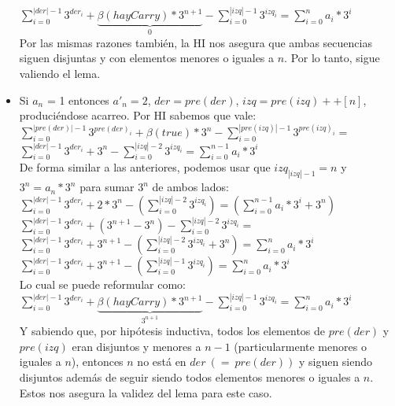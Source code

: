 \begin{itemize}
	$\sum_{i=0}^{|der|-1} 3^{der_i} + \underbrace{\beta(hayCarry)*3^{n+1}}_\text{0} - \sum_{i=0}^{|izq|-1} 3^{izq_i} = \sum_{i=0}^{n} a_i*3^{i} $
	\\

	Por las mismas razones también, la HI nos asegura que ambas secuencias siguen disjuntas y con elementos menores o iguales a $n$. Por lo tanto, sigue valiendo el lema.

	\item Si $a_n$ = 1 entonces $a'_n = 2$, $der = pre(der)$, $izq = pre(izq)++[n]$, produciéndose acarreo. Por HI sabemos que vale: \\

	$\sum_{i=0}^{|pre(der)|-1} 3^{pre(der)_i} + \beta(true)*3^{n} - \sum_{i=0}^{|pre(izq)|-1} 3^{pre(izq)_i} =$
	\\

	$\sum_{i=0}^{|der|-1} 3^{der_i} + 3^{n} - \sum_{i=0}^{|izq|-2} 3^{izq_i} = \sum_{i=0}^{n-1} a_i*3^{i} $
	\\

	De forma similar a las anteriores, podemos usar que $izq_{|izq|-1} = n$ y $ 3^{n} = a_{n}*3^{n}$ para sumar $3^{n}$ de ambos lados:
	\\

	$\sum_{i=0}^{|der|-1} 3^{der_i} + 2*3^{n} - (\sum_{i=0}^{|izq|-2} 3^{izq_i}) = (\sum_{i=0}^{n-1} a_i*3^{i} + 3^{n}) $
	\\

	$\sum_{i=0}^{|der|-1} 3^{der_i} + (3^{n+1}-3^{n}) - \sum_{i=0}^{|izq|-2} 3^{izq_i} = $
	\\

	$\sum_{i=0}^{|der|-1} 3^{der_i} + 3^{n+1} - (\sum_{i=0}^{|izq|-2} 3^{izq_i} + 3^{n}) = \sum_{i=0}^{n} a_i*3^{i} $	\\

	$\sum_{i=0}^{|der|-1} 3^{der_i} + 3^{n+1} - (\sum_{i=0}^{|izq|-1} 3^{izq_i}) = \sum_{i=0}^{n} a_i*3^{i} $
	\\

	Lo cual se puede reformular como: \\

	$\sum_{i=0}^{|der|-1} 3^{der_i} + \underbrace{\beta(hayCarry)*3^{n+1}}_\text{$3^{n+1}$} - \sum_{i=0}^{|izq|-1} 3^{izq_i} = \sum_{i=0}^{n} a_i*3^{i} $
	\\

	Y sabiendo que, por hipótesis inductiva, todos los elementos de $pre(der)$ y $pre(izq)$ eran disjuntos y menores a $n-1$ (particularmente menores o iguales a $n$), entonces $n$ no está en $der\ (=\ pre(der))$ y siguen siendo disjuntos además de seguir siendo todos elementos menores o iguales a $n$. Estos nos asegura la validez del lema para este caso.


\end{itemize}
